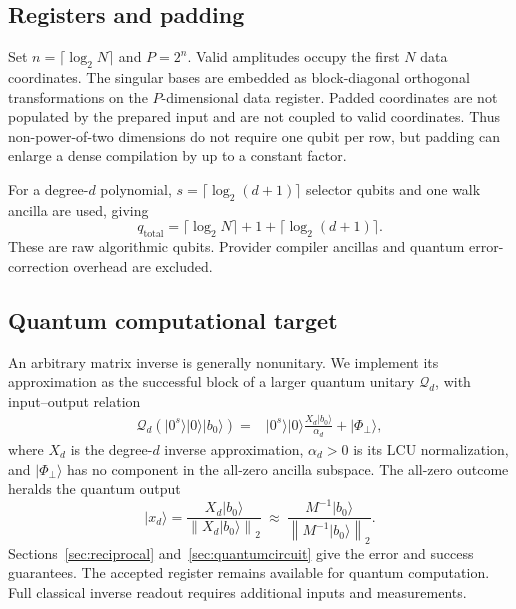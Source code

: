 \documentclass[journal]{IEEEtran}
\newcommand{\norm}[1]{\left\lVert#1\right\rVert}
\newcommand{\ket}[1]{\lvert#1\rangle}
\begin{document}
\subsection{Registers and padding}
Set $n=\lceil\log_2N\rceil$ and $P=2^n$. Valid amplitudes occupy the first
$N$ data coordinates. The singular bases are embedded as block-diagonal
orthogonal transformations on the $P$-dimensional data register. Padded
coordinates are not populated by the prepared input and are not coupled to
valid coordinates. Thus non-power-of-two dimensions do not require one qubit
per row, but padding can enlarge a dense compilation by up to a constant factor.

For a degree-$d$ polynomial, $s=\lceil\log_2(d+1)\rceil$ selector qubits and
one walk ancilla are used, giving
\begin{equation}
 q_{\mathrm{total}}=\lceil\log_2N\rceil+1+
                    \lceil\log_2(d+1)\rceil.
 \label{eq:qubits}
\end{equation}
These are raw algorithmic qubits. Provider compiler ancillas and quantum
error-correction overhead are excluded.

\subsection{Quantum computational target}
An arbitrary matrix inverse is generally nonunitary. We implement its
approximation as the successful block of a larger quantum unitary
$\mathcal Q_d$, with input--output relation
\begin{equation}
 \begin{split}
 \mathcal Q_d(\ket{0^s}\ket0\ket{b_0})
 ={}&\ket{0^s}\ket0\frac{X_d\ket{b_0}}{\alpha_d}
       +\ket{\Phi_\perp},
 \end{split}
 \label{eq:quantumtarget}
\end{equation}
where $X_d$ is the degree-$d$ inverse approximation, $\alpha_d>0$ is its
LCU normalization, and $\ket{\Phi_\perp}$ has no component in the all-zero
ancilla subspace. The all-zero outcome heralds the quantum output
\begin{equation}
 \ket{x_d}=\frac{X_d\ket{b_0}}{\norm{X_d\ket{b_0}}_2}
 \ \approx\ \frac{M^{-1}\ket{b_0}}{\norm{M^{-1}\ket{b_0}}_2}.
 \label{eq:quantumoutput}
\end{equation}
Sections~\ref{sec:reciprocal} and~\ref{sec:quantumcircuit} give the error and
success guarantees. The accepted
register remains available for quantum computation. Full classical
inverse readout requires additional inputs and measurements.
\end{document}
